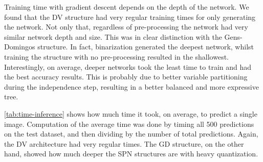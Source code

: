 Training time with gradient descent depends on the depth of the network. We found that the DV
structure had very regular training times for only generating the network. Not only that,
regardless of pre-processing the network had very similar network depth and size. This was in clear
distinction with the Gens-Domingos structure. In fact, binarization generated the deepest network,
whilst training the structure with no pre-processing resulted in the shallowest. Interestingly,
on average, deeper networks took the least time to train and had the best accuracy results. This is
probably due to better variable partitioning during the independence step, resulting in a better
balanced and more expressive tree.

\autoref{tab:time-inference} shows how much time it took, on average, to predict a single image.
Computation of the average time was done by timing all 500 predictions on the test dataset, and
then dividing by the number of total predictions.  Again, the DV architecture had very regular
times. The GD structure, on the other hand, showed how much deeper the SPN structures are with
heavy quantization.


